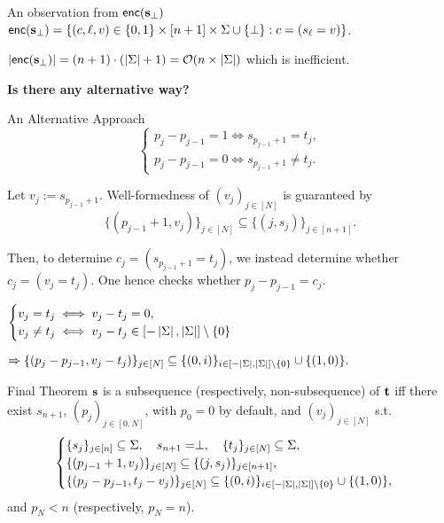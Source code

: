 \begin{frame}{An observation from $\mathsf{enc}(\mathbf{s}_\perp)$}
	$\mathsf{enc}(\mathbf{s}_\perp)  = \{(c, \ell, v) \in \{0,1\}\times[n+1]\times\Sigma\cup\{\perp\} : c = (s_\ell = v)\}$.
	
	$\left|\mathsf{enc}(\mathbf{s}_\perp)\right| = (n + 1)\cdot (\left|\Sigma\right| + 1) = \mathcal{O}(n \times \left|\Sigma\right|)$ which is inefficient.
	
	\pause
	\begin{center}
		\textbf{Is there any alternative way?}
	\end{center}
\end{frame}

\begin{frame}{An Alternative Approach}
	\begin{equation*}
		\begin{cases}
			p_j - p_{j - 1} = 1 \iff s_{p_{j - 1} + 1} = t_j,\\ 
			p_j - p_{j - 1} = 0 \iff s_{p_{j - 1} + 1} \not= t_j.
		\end{cases}
	\end{equation*}
	
	Let $v_j := s_{p_{j - 1} + 1}$. Well-formedness of $(v_j)_{j \in [N]}$ is guaranteed by
	\begin{equation*}
		\{(p_{j - 1} + 1, v_j)\}_{j \in [N]} \subseteq \{(j, s_j)\}_{j \in [n + 1]}.
	\end{equation*}
	
	Then, to determine $ c_j = (s_{p_{j - 1} + 1} = t_j)$, we instead determine whether $c_j = (v_j = t_j)$. One hence checks whether $p_j - p_{j - 1} = c_j$.
	
	$
		\begin{cases}
			v_j = t_j \iff v_j - t_j = 0,\\ v_j\not=t_j\iff v_j - t_j \in [-\left|\Sigma\right|, \left|\Sigma\right|]\setminus\{0\}
		\end{cases}
	$ 
	
	$
		\Rightarrow \{(p_j - p_{j - 1}, v_j - t_j)\}_{j \in [N]} \subseteq \{(0, i)\}_{i \in [-\left|\Sigma\right|, \left|\Sigma\right|]\setminus\{0\}} \cup \{(1, 0)\}.
	$
\end{frame}

\begin{frame}{Final Theorem}
	$\mathbf{s}$ is a subsequence (respectively, non-subsequence) of $\mathbf{t}$  iff there exist $s_{n+1}$, $(p_j)_{j \in [0, N]}$, with $p_0=0$ by default,  and $(v_j)_{j \in [N]}$ s.t.
	\begin{equation*}%
		\begin{cases}
			\{s_j\}_{j \in [n]} \subseteq \Sigma,\quad s_{n+1} = \perp,\quad \{t_j\}_{j \in [N]} \subseteq \Sigma,\\
			\{(p_{j - 1} + 1, v_j)\}_{j \in [N]} \subseteq \{(j, s_j)\}_{j \in [n+1]},\\
			\{(p_j - p_{j - 1}, t_j - v_j)\}_{j \in [N]} \subseteq \{(0,i)\}_{i \in [-\size{\Sigma}, \size{\Sigma}]\setminus\{0\}} \cup \{(1, 0)\},
		\end{cases}
	\end{equation*}
	and $p_N < n$ (respectively, $p_N = n$).
\end{frame}